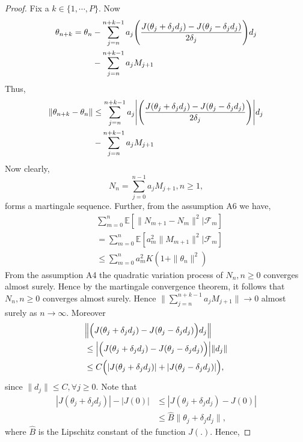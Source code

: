 \begin{proof}
 Fix a $k \in \{1,\cdots,P \}.$ Now
 \begin{align*}
 \begin{split}
 \theta_{n+k} = \theta_n & -\sum_{j=n}^{n+k-1}a_j\Bigg{(}\frac{J(\theta_j+\delta_j d_j)-J(\theta_j-\delta_j d_j)}{2\delta_j}\Bigg{)}d_j \\ 
  &-\sum_{j=n}^{n+k-1}a_jM_{j+1}
 \end{split}
 \end{align*}
 Thus,
 \begin{align*}
 \begin{split}
 \|\theta_{n+k}-\theta_n\| &\leq \sum_{j=n}^{n+k-1}a_j\Bigg{|}\Bigg{(}\frac{J(\theta_j+\delta_{j} d_j)-J(\theta_j-\delta_{j} d_j)}{2\delta_j}\Bigg{)}\Bigg{|}d_j\\
 &-\sum_{j=n}^{n+k-1}a_jM_{j+1}
\end{split}
 \end{align*}
Now clearly,
$$N_n=\sum_{j=0}^{n-1}a_jM_{j+1}, n\geq1,$$
forms a martingale sequence.
Further, from the assumption A6 we have,
\begin{align*}
& \sum_{m=0}^{n}\mathbb{E}[\|N_{m+1}-N_{m}\|^2|\mathcal{F}_{m}] \\
& =\sum_{m=0}^{n}\mathbb{E}[a_{m}^2\|M_{m+1}\|^2|\mathcal{F}_{m}]\\
& \leq \sum_{m=0}^{n}a_{m}^2K(1+\|\theta_n\|^2)
\end{align*}
From the assumption A4 the quadratic variation process of $N_n,n\geq0$ converges 
almost surely. Hence by the martingale convergence theorem, it follows that 
$N_n, n\geq0$ converges almost surely. Hence
$\|\sum\limits_{j=n}^{n+k-1}a_jM_{j+1}\|\rightarrow 0$ almost surely as $n\rightarrow \infty.$
Moreover
\begin{align*}
&\Big{\|}\Big{(}J(\theta_j+\delta_j d_j)-J(\theta_j-\delta_j d_j)\Big{)}d_j\Big{\|} \\
& \leq \Big{|}\Big{(}J(\theta_j+\delta_j d_j)-J(\theta_j-\delta_j d_j)\Big{)}\Big{|}\|d_j\|\\
& \leq C \Big{(}|J(\theta_j+\delta_j d_j)|+|J(\theta_j-\delta_j d_j)|\Big{)},
\end{align*}
since $\|d_j\|\leq C, \forall j \geq0.$
Note that
\begin{align*}
|J(\theta_j+\delta_j d_j)|-|J(0)| & \leq|J(\theta_j+\delta_j d_j)-J(0)| \\
& \leq \hat{B} \|\theta_j+\delta_j d_j\|,
\end{align*}
where $\hat{B}$ is the Lipschitz constant of the function $J(.).$ Hence,

\end{proof}
